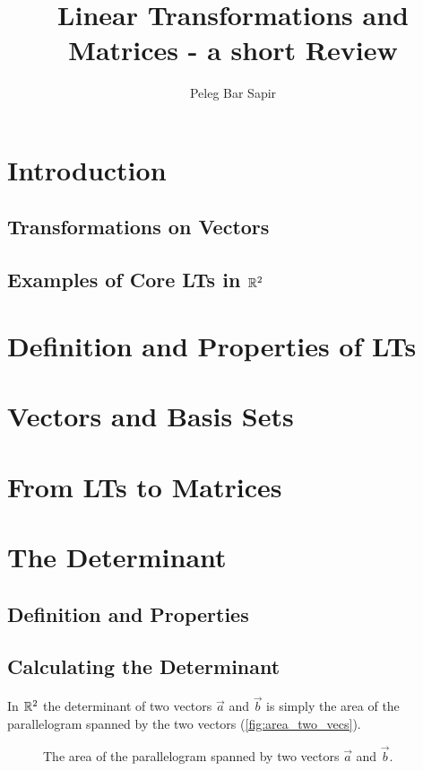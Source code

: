 \documentclass{article}
\title{Linear Transformations and Matrices - a short Review}
\author{Peleg Bar Sapir}
\begin{document}
\maketitle

\section{Introduction}
\subsection{Transformations on Vectors}
\subsection{Examples of Core LTs in $\Rs[2]$}

\section{Definition and Properties of LTs}

\section{Vectors and Basis Sets}

\section{From LTs to Matrices}

\section{The Determinant}
\subsection{Definition and Properties}
\subsection{Calculating the Determinant}
In $\Rs[2]$ the determinant of two vectors $\vec{a}$ and $\vec{b}$ is simply the area of the parallelogram spanned by the two vectors (\autoref{fig:area_two_vecs}).

\begin{figure}
	\begin{center}
	\end{center}
	\caption{The area of the parallelogram spanned by two vectors $\vec{a}$ and $\vec{b}$.}
	\label{fig:area_two_vecs}
\end{figure}
\end{document}
